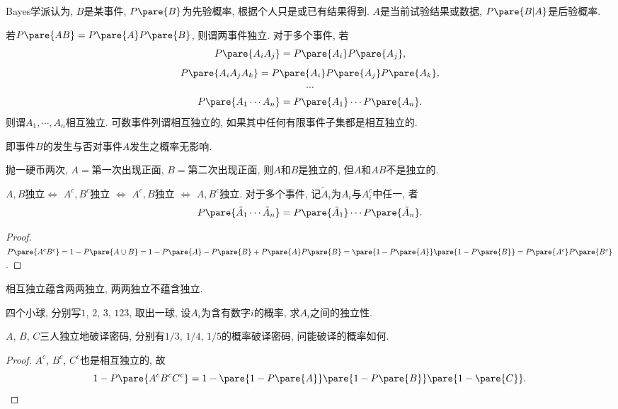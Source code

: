 \documentclass{ctexart}
\begin{document}
\begin{remark}
    Bayes学派认为, $B$是某事件, $P\pare{B}$为先验概率, 根据个人只是或已有结果得到. $A$是当前试验结果或数据, $P\pare{B\vert A}$是后验概率.
\end{remark}
\begin{definition}
    若$P\pare{AB} = P\pare{A}P\pare{B}$, 则谓两事件独立. 对于多个事件, 若
    \[ P\pare{A_iA_j} = P\pare{A_i}P\pare{A_j}, \]
    \[ P\pare{A_iA_jA_k} = P\pare{A_i}P\pare{A_j}P\pare{A_k}, \]
    \[ \cdots \]
    \[ P\pare{A_1\cdots A_n} = P\pare{A_1} \cdots P\pare{A_n}. \]
    则谓$A_1,\cdots, A_n$相互独立. 可数事件列谓相互独立的, 如果其中任何有限事件子集都是相互独立的.
\end{definition}
\begin{remark}
    即事件$B$的发生与否对事件$A$发生之概率无影响.
\end{remark}
\begin{sample}
    \begin{ex}
        抛一硬币两次, $A=$第一次出现正面, $B=$第二次出现正面, 则$A$和$B$是独立的, 但$A$和$AB$不是独立的.
    \end{ex}
\end{sample}
\begin{theorem}
    $A,B$独立$\Leftrightarrow$ $A^c,B^c$独立 $\Leftrightarrow$ $A^c,B$独立 $\Leftrightarrow$ $A,B^c$独立. 对于多个事件, 记$\tilde{A}_i$为$A_i$与$A_i^c$中任一, 者
    \[ P\pare{\tilde{A}_1\cdots \tilde{A}_n} = P\pare{\tilde{A}_1}\cdots P\pare{\tilde{A}_n}. \]
\end{theorem}
\begin{proof}
    $P\pare{A^cB^c} = 1-P\pare{A\cup B} = 1-P\pare{A} - P\pare{B} + P\pare{A}P\pare{B} = \pare{1-P\pare{A}}\pare{1-P\pare{B}} = P\pare{A^c}P\pare{B^c}$.
\end{proof}
\begin{pitfall}
    相互独立蕴含两两独立, 两两独立不蕴含独立.
\end{pitfall}
\begin{ex}
    四个小球, 分别写$1$, $2$, $3$, $123$, 取出一球, 设$A_i$为含有数字$i$的概率, 求$A_i$之间的独立性.
\end{ex}
\begin{sample}
    \begin{ex}
        $A$, $B$, $C$三人独立地破译密码, 分别有$1/3$, $1/4$, $1/5$的概率破译密码, 问能破译的概率如何.
    \end{ex}
    \begin{proof}
        $A^c$, $B^c$, $C^c$也是相互独立的, 故
        \[ 1-P\pare{A^cB^cC^c} = 1-\pare{1-P\pare{A}}\pare{1-P\pare{B}}\pare{1-\pare{C}}. \qedhere \]
    \end{proof}
\end{sample}
\end{document}
